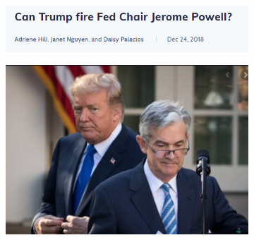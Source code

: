 \documentclass[]{beamer}
\begin{document}
\begin{frame}
\begin{figure}[h]
            \begin{subfigure}[h]{0.475\textwidth}
                \centering
                \includegraphics[width=0.95\hsize]{../../Output/Figures/Fire_JP_Headline.png} 
            \end{subfigure}
            \hfill
            \begin{subfigure}[h]{0.475\textwidth}
                \centering
                \includegraphics[width=0.95\hsize]{../../Output/Figures/Trump_and_JP.png}
            \end{subfigure}
    
        \end{figure}

    \end{frame}
\end{document}
